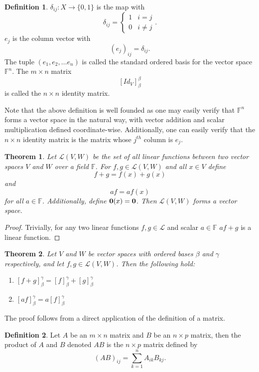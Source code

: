 \documentclass[oneside, 12pt]{book}
\newtheorem{thm}{Theorem}[section]
\theoremstyle{definition}
\newtheorem{defn}{Definition}[section]
\begin{document}
\begin{defn}
\label{defn_id}
  $\delta_{ij}:X \to \{0,1\}$ is the map with \[\delta_{ij}=
  \begin{cases}
    1 & i=j \\
    0 & i\neq j
  \end{cases}.\]
$e_{j}$ is the column vector with \[(e_{j})_{ij}=\delta_{ij}.\]
The tuple $(e_{1}, e_{2}, \dots e_{n})$ is called the standard ordered basis for the vector space $\mathbb{F}^{n}$. The $m \times n$ matrix \[[Id_{V}]_{\beta}^{\beta}\] is called the $n \times n$ identity matrix.

\end{defn}
Note that the above definition is well founded as one may easily verify that $\mathbb{F}^{n}$ forms a vector space in the natural way, with vector addition and scalar multiplication defined coordinate-wise.
Additionally, one can easily verify that the $n \times n$ identity matrix is the matrix whose $j^{th}$ column is $e_{j}$.
\begin{thm}
\label{thm_spacelin}
  Let $\mathcal{L}(V,W)$ be the set of all linear functions between two vector spaces $V$ and $W$ over a field $\mathbb{F}$. For $f,g \in \mathcal{L}(V,W)$ and all $x \in V$ define \[f+g=f(x)+g(x)\] and \[af=af(x)\] for all $a \in \mathbb{F}$. Additionally, define $\bold{0}(x)=\bold{0}$. Then $\mathcal{L}(V,W)$ forms a vector space.
\end{thm}
\begin{proof}
Trivially, for any two linear functions $f,g \in \mathcal{L}$ and scalar $a \in \mathbb{F}$ $af+g$ is a linear function.
\end{proof}
\begin{thm}
\label{thm_matsum}
  Let $V$ and $W$ be vector spaces with ordered bases $\beta$ and $\gamma$ respectively, and let $f,g \in \mathcal{L}(V,W)$. Then the following hold:
  \begin{enumerate}
          \item $[f+g]_{\beta}^{\gamma}=[f]_{\beta}^{\gamma}+[g]_{\beta}^{\gamma}$
          \item $[af]_{\beta}^{\gamma}=a[f]_{\beta}^{\gamma}$
  \end{enumerate}
\end{thm}
The proof follows from a direct application of the definition of a matrix.
\begin{defn}
\label{defn_matprod}
  Let $A$ be an $m \times n$ matrix and $B$ be an $n \times p$ matrix, then the product of $A$ and $B$ denoted $AB$ is the $n \times p$ matrix defined by
  \[(AB)_{ij}=\sum_{k=1}^{n}A_{ik}B_{kj}.\]
\end{defn}
\end{document}
